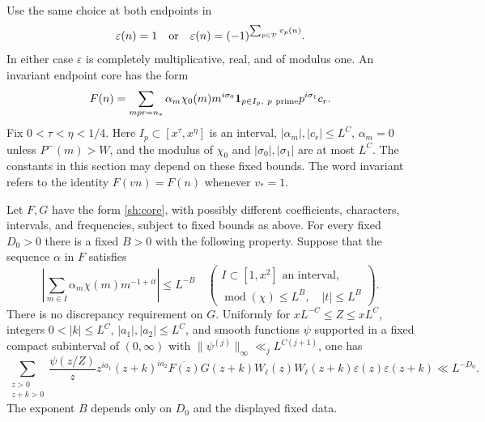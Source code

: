 Use the same choice at both endpoints in
\begin{equation}\label{sh:sign}
 \varepsilon(n)=1\quad\hbox{or}\quad
 \varepsilon(n)=(-1)^{\sum_{p\in\mathcal P}v_p(n)}.
\end{equation}
In either case $\varepsilon$ is completely multiplicative, real,
and of modulus one.  An invariant endpoint core has the form
\begin{equation}\label{sh:core}
 F(n)=\sum_{mpr=n_*}\alpha_m\chi_0(m)m^{i\sigma_0}
           \mathbf{1}_{p\in I_p,\ p\ {\rm prime}}p^{i\sigma_1}c_r.
\end{equation}
Fix $0<\tau<\eta<1/4$.  Here $I_p\subset[x^\tau,x^\eta]$ is an
interval, $|\alpha_m|,|c_r|\leq L^{C}$,
$\alpha_m=0$ unless $P^-(m)>W$, and the modulus of $\chi_0$ and
$|\sigma_0|,|\sigma_1|$ are at most $L^C$.  The constants in this
section may depend on these fixed bounds.  The word invariant refers
to the identity $F(vn)=F(n)$ whenever $v_*=1$.

\begin{theorem}\label{sh:correlation}
Let $F,G$ have the form \eqref{sh:core}, with possibly different
coefficients, characters, intervals, and frequencies, subject to fixed
bounds as above.  For every fixed $D_0>0$ there is a fixed $B>0$ with
the following property.  Suppose that the sequence $\alpha$ in $F$
satisfies
\begin{equation}\label{sh:discrepancy}
 \left|\sum_{m\in I}\alpha_m\chi(m)m^{-1+it}\right|\leq L^{-B}
 \quad\left(
 \begin{array}{l}
 I\subset[1,x^2]\text{ an interval},\\
 \operatorname{mod}(\chi)\leq L^B,\quad |t|\leq L^B
 \end{array}\right).
\end{equation}
There is no discrepancy requirement on $G$.  Uniformly for
$xL^{-C}\leq Z\leq xL^C$, integers $0<|k|\leq L^C$,
$|a_1|,|a_2|\leq L^C$, and smooth functions $\psi$ supported in a
fixed compact subinterval of $(0,\infty)$ with
$\|\psi^{(j)}\|_\infty\ll_j L^{C(j+1)}$, one has
\begin{equation}\label{sh:correlation-bound}
 \sum_{\substack{z>0\\z+k>0}}\frac{\psi(z/Z)}z
 z^{ia_1}(z+k)^{ia_2}\overline{F(z)}G(z+k)
 W_\ell(z)W_\ell(z+k)\varepsilon(z)\varepsilon(z+k)
 \ll L^{-D_0}.
\end{equation}
The exponent $B$ depends only on $D_0$ and the displayed fixed data.
\end{theorem}

